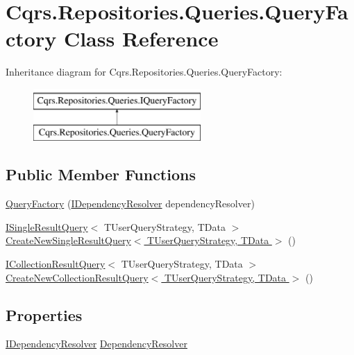 \hypertarget{classCqrs_1_1Repositories_1_1Queries_1_1QueryFactory}{}\section{Cqrs.\+Repositories.\+Queries.\+Query\+Factory Class Reference}
\label{classCqrs_1_1Repositories_1_1Queries_1_1QueryFactory}
Inheritance diagram for Cqrs.\+Repositories.\+Queries.\+Query\+Factory\+:\begin{figure}[H]
\begin{center}
\leavevmode
\includegraphics[height=2.000000cm]{classCqrs_1_1Repositories_1_1Queries_1_1QueryFactory}
\end{center}
\end{figure}
\subsection*{Public Member Functions}
\begin{DoxyCompactItemize}
\item 
\hyperlink{classCqrs_1_1Repositories_1_1Queries_1_1QueryFactory_a8956a30f5d8abbf49ca4ca24756a83da}{Query\+Factory} (\hyperlink{interfaceCqrs_1_1Configuration_1_1IDependencyResolver}{I\+Dependency\+Resolver} dependency\+Resolver)
\item 
\hyperlink{interfaceCqrs_1_1Repositories_1_1Queries_1_1ISingleResultQuery}{I\+Single\+Result\+Query}$<$ T\+User\+Query\+Strategy, T\+Data $>$ \hyperlink{classCqrs_1_1Repositories_1_1Queries_1_1QueryFactory_aefca41f8cab3f333984b782e7c87f3d1}{Create\+New\+Single\+Result\+Query$<$ T\+User\+Query\+Strategy, T\+Data $>$} ()
\item 
\hyperlink{interfaceCqrs_1_1Repositories_1_1Queries_1_1ICollectionResultQuery}{I\+Collection\+Result\+Query}$<$ T\+User\+Query\+Strategy, T\+Data $>$ \hyperlink{classCqrs_1_1Repositories_1_1Queries_1_1QueryFactory_aaadcf9eb14390c49d668023a9e9950d7}{Create\+New\+Collection\+Result\+Query$<$ T\+User\+Query\+Strategy, T\+Data $>$} ()
\end{DoxyCompactItemize}
\subsection*{Properties}
\begin{DoxyCompactItemize}
\item 
\hyperlink{interfaceCqrs_1_1Configuration_1_1IDependencyResolver}{I\+Dependency\+Resolver} \hyperlink{classCqrs_1_1Repositories_1_1Queries_1_1QueryFactory_a550e1e11b126247c5adebdd384000252}{Dependency\+Resolver}
\end{DoxyCompactItemize}



